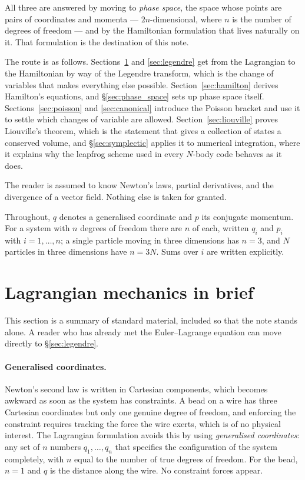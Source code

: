 \documentclass[12pt]{article}
\begin{document}
All three are answered by moving to \emph{phase space}, the space whose
points are pairs of coordinates and momenta --- $2n$-dimensional, where
$n$ is the number of degrees of freedom --- and by the Hamiltonian
formulation that lives naturally on it.  That formulation is the
destination of this note.

The route is as follows.  Sections~\ref{sec:lagrange} and
\ref{sec:legendre} get from the Lagrangian to the Hamiltonian by way of
the Legendre transform, which is the change of variables that makes
everything else possible.  Section~\ref{sec:hamilton} derives Hamilton's
equations, and \S\ref{sec:phase_space} sets up phase space itself.
Sections~\ref{sec:poisson} and \ref{sec:canonical} introduce the Poisson
bracket and use it to settle which changes of variable are allowed.
Section~\ref{sec:liouville} proves Liouville's theorem, which is the
statement that gives a collection of states a conserved volume, and
\S\ref{sec:symplectic} applies it to numerical integration, where it
explains why the leapfrog scheme used in every $N$-body code behaves as
it does.

The reader is assumed to know Newton's laws, partial derivatives, and
the divergence of a vector field.  Nothing else is taken for granted.

Throughout, $q$ denotes a generalised coordinate and $p$ its conjugate
momentum.  For a system with $n$ degrees of freedom there are $n$ of
each, written $q_i$ and $p_i$ with $i = 1,\ldots,n$; a single particle
moving in three dimensions has $n = 3$, and $N$ particles in three
dimensions have $n = 3N$.  Sums over $i$ are written explicitly.

\section{Lagrangian mechanics in brief}
\label{sec:lagrange}

This section is a summary of standard material, included so that the
note stands alone.  A reader who has already met the Euler--Lagrange
equation can move directly to \S\ref{sec:legendre}.

\paragraph{Generalised coordinates.}  Newton's second law is written in
Cartesian components, which becomes awkward as soon as the system has
constraints.  A bead on a wire has three Cartesian coordinates but only
one genuine degree of freedom, and enforcing the constraint requires
tracking the force the wire exerts, which is of no physical interest.
The Lagrangian formulation avoids this by using \emph{generalised
coordinates}: any set of $n$ numbers $q_1,\ldots,q_n$ that specifies
the configuration of the system completely, with $n$ equal to the
number of true degrees of freedom.  For the bead, $n = 1$ and $q$ is
the distance along the wire.  No constraint forces appear.
\end{document}
